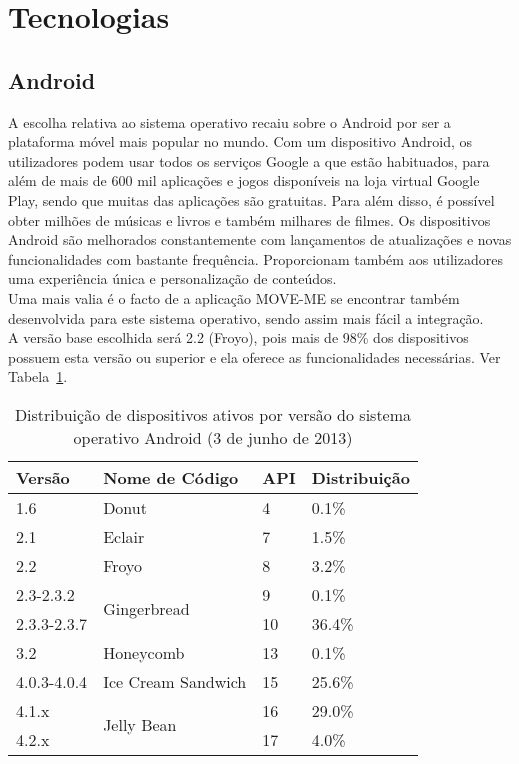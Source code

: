 \section{Tecnologias}

\subsection{Android}

A escolha relativa ao sistema operativo recaiu sobre o Android por ser a plataforma móvel mais popular no mundo. Com um dispositivo Android, os utilizadores podem usar todos os serviços Google a que estão habituados, para além de mais de 600 mil aplicações e jogos disponíveis na loja virtual Google Play, sendo que muitas das aplicações são gratuitas. Para além disso, é possível obter milhões de músicas e livros e também milhares de filmes. Os dispositivos Android são melhorados constantemente com lançamentos de atualizações e novas funcionalidades com bastante frequência. Proporcionam também aos utilizadores uma experiência única e personalização de conteúdos.
\\Uma mais valia é o facto de a aplicação MOVE-ME se encontrar também desenvolvida para este sistema operativo, sendo assim mais fácil a integração.
\\A versão base escolhida será 2.2 (Froyo), pois mais de 98\% dos dispositivos possuem esta versão ou superior e ela oferece as funcionalidades necessárias. Ver Tabela~\ref{tab:android}.

\begin{table}[t]
  \centering
  \caption{Distribuição de dispositivos ativos por versão do sistema operativo Android (3 de junho de 2013)\cite{dashboards}}
\begin{tabular}{p{20mm} p{45mm} p{10mm} p{20mm} }
	\hline
\textbf{Versão} & \textbf{Nome de Código} & \textbf{API} & \textbf{Distribuição}\\
	\hline
	\hline
	1.6 & Donut & 4 & 0.1\%\\\hline
	2.1 & Eclair & 7 & 1.5\%\\\hline
	2.2 & Froyo & 8 & 3.2\%\\\hline
	2.3-2.3.2 & \multirow{2}{*}{Gingerbread} & 9 & 0.1\%\\
	2.3.3-2.3.7 & & 10 & 36.4\%\\\hline
	3.2 & Honeycomb & 13 & 0.1\%\\\hline
	4.0.3-4.0.4 & Ice Cream Sandwich & 15 & 25.6\%\\\hline
	4.1.x & \multirow{2}{*}{Jelly Bean} & 16 & 29.0\%\\
	4.2.x & & 17 & 4.0\%\\\hline
\end{tabular}
  \label{tab:android}
\end{table}

